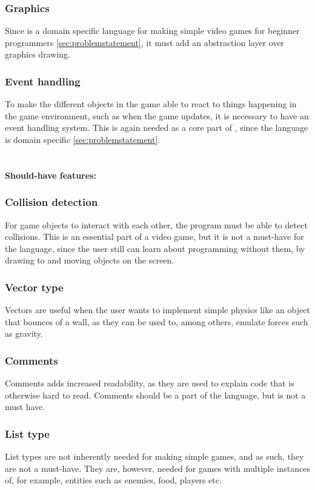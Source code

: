 \subsubsection*{Graphics}
Since \lang{} is a domain specific language for making simple video games for beginner programmers \ref{sec:problemstatement}, it must add an abstraction layer over graphics drawing.

\subsubsection*{Event handling}
To make the different objects in the game able to react to things happening in the game environment, such as when the game updates, it is necessary to have an event handling system. This is again needed as a core part of \lang{}, since the language is domain specific \ref{sec:problemstatement}.
\\ \\ \\
\Large \textbf{Should-have features:} \normalsize \vspace{-7mm}
\subsubsection*{Collision detection}
For game objects to interact with each other, the program must be able to detect collisions. This is an essential part of a video game, but it is not a must-have for the language, since the user still can learn about programming without them, by drawing to and moving objects on the screen.

\subsubsection*{Vector type}
Vectors are useful when the user wants to implement simple physics like an object that bounces of a wall, as they can be used to, among others, emulate forces such as gravity.

\subsubsection*{Comments}
Comments adds increased readability, as they are used to explain code that is otherwise hard to read. Comments should be a part of the language, but is not a must have.

\subsubsection*{List type}
List types are not inherently needed for making simple games, and as such, they are not a must-have. They are, however, needed for games with multiple instances of, for example, entities such as enemies, food, players etc.

